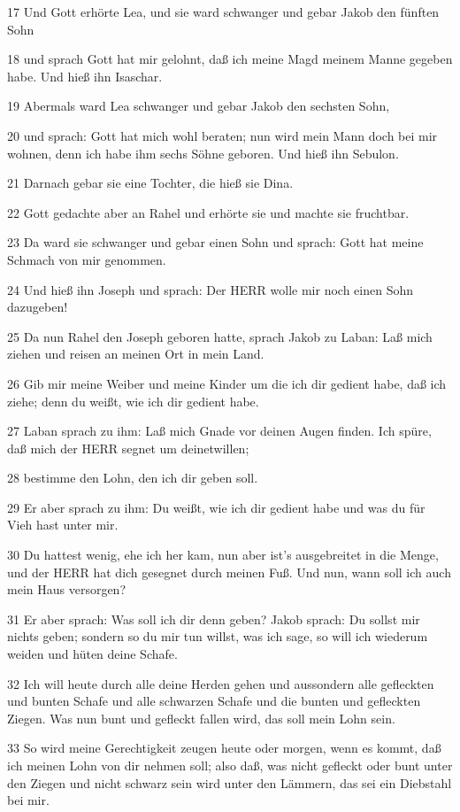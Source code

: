 \par 17 Und Gott erhörte Lea, und sie ward schwanger und gebar Jakob den fünften Sohn
\par 18 und sprach Gott hat mir gelohnt, daß ich meine Magd meinem Manne gegeben habe. Und hieß ihn Isaschar.
\par 19 Abermals ward Lea schwanger und gebar Jakob den sechsten Sohn,
\par 20 und sprach: Gott hat mich wohl beraten; nun wird mein Mann doch bei mir wohnen, denn ich habe ihm sechs Söhne geboren. Und hieß ihn Sebulon.
\par 21 Darnach gebar sie eine Tochter, die hieß sie Dina.
\par 22 Gott gedachte aber an Rahel und erhörte sie und machte sie fruchtbar.
\par 23 Da ward sie schwanger und gebar einen Sohn und sprach: Gott hat meine Schmach von mir genommen.
\par 24 Und hieß ihn Joseph und sprach: Der HERR wolle mir noch einen Sohn dazugeben!
\par 25 Da nun Rahel den Joseph geboren hatte, sprach Jakob zu Laban: Laß mich ziehen und reisen an meinen Ort in mein Land.
\par 26 Gib mir meine Weiber und meine Kinder um die ich dir gedient habe, daß ich ziehe; denn du weißt, wie ich dir gedient habe.
\par 27 Laban sprach zu ihm: Laß mich Gnade vor deinen Augen finden. Ich spüre, daß mich der HERR segnet um deinetwillen;
\par 28 bestimme den Lohn, den ich dir geben soll.
\par 29 Er aber sprach zu ihm: Du weißt, wie ich dir gedient habe und was du für Vieh hast unter mir.
\par 30 Du hattest wenig, ehe ich her kam, nun aber ist's ausgebreitet in die Menge, und der HERR hat dich gesegnet durch meinen Fuß. Und nun, wann soll ich auch mein Haus versorgen?
\par 31 Er aber sprach: Was soll ich dir denn geben? Jakob sprach: Du sollst mir nichts geben; sondern so du mir tun willst, was ich sage, so will ich wiederum weiden und hüten deine Schafe.
\par 32 Ich will heute durch alle deine Herden gehen und aussondern alle gefleckten und bunten Schafe und alle schwarzen Schafe und die bunten und gefleckten Ziegen. Was nun bunt und gefleckt fallen wird, das soll mein Lohn sein.
\par 33 So wird meine Gerechtigkeit zeugen heute oder morgen, wenn es kommt, daß ich meinen Lohn von dir nehmen soll; also daß, was nicht gefleckt oder bunt unter den Ziegen und nicht schwarz sein wird unter den Lämmern, das sei ein Diebstahl bei mir.
